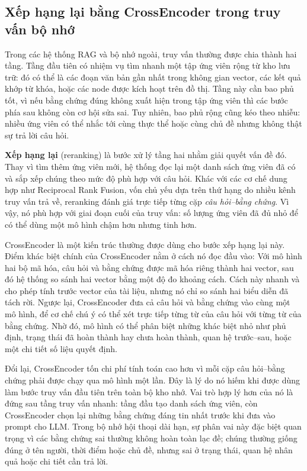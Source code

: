 \documentclass[../main.tex]{subfiles}
\begin{document}
\subsection{Xếp hạng lại bằng CrossEncoder trong truy vấn bộ nhớ}

Trong các hệ thống RAG và bộ nhớ ngoài, truy vấn thường được chia thành hai tầng. Tầng đầu tiên có nhiệm vụ tìm nhanh một tập ứng viên rộng từ kho lưu trữ: đó có thể là các đoạn văn bản gần nhất trong không gian vector, các kết quả khớp từ khóa, hoặc các node được kích hoạt trên đồ thị. Tầng này cần bao phủ tốt, vì nếu bằng chứng đúng không xuất hiện trong tập ứng viên thì các bước phía sau không còn cơ hội sửa sai. Tuy nhiên, bao phủ rộng cũng kéo theo nhiễu: nhiều ứng viên có thể nhắc tới cùng thực thể hoặc cùng chủ đề nhưng không thật sự trả lời câu hỏi.

\textbf{Xếp hạng lại} (reranking) là bước xử lý tầng hai nhằm giải quyết vấn đề đó. Thay vì tìm thêm ứng viên mới, hệ thống đọc lại một danh sách ứng viên đã có và sắp xếp chúng theo mức độ phù hợp với câu hỏi. Khác với các cơ chế dung hợp như Reciprocal Rank Fusion, vốn chủ yếu dựa trên thứ hạng do nhiều kênh truy vấn trả về, reranking đánh giá trực tiếp từng cặp \textit{câu hỏi--bằng chứng}. Vì vậy, nó phù hợp với giai đoạn cuối của truy vấn: số lượng ứng viên đã đủ nhỏ để có thể dùng một mô hình chậm hơn nhưng tinh hơn.

CrossEncoder là một kiến trúc thường được dùng cho bước xếp hạng lại này. Điểm khác biệt chính của CrossEncoder nằm ở cách nó đọc đầu vào: Với mô hình hai bộ mã hóa, câu hỏi và bằng chứng được mã hóa riêng thành hai vector, sau đó hệ thống so sánh hai vector bằng một độ đo khoảng cách. Cách này nhanh và cho phép tính trước vector của tài liệu, nhưng nó chỉ so sánh hai biểu diễn đã tách rời. Ngược lại, CrossEncoder đưa cả câu hỏi và bằng chứng vào cùng một mô hình, để cơ chế chú ý có thể xét trực tiếp từng từ của câu hỏi với từng từ của bằng chứng. Nhờ đó, mô hình có thể phân biệt những khác biệt nhỏ như phủ định, trạng thái đã hoàn thành hay chưa hoàn thành, quan hệ trước--sau, hoặc một chi tiết số liệu quyết định.

Đổi lại, CrossEncoder tốn chi phí tính toán cao hơn vì mỗi cặp câu hỏi--bằng chứng phải được chạy qua mô hình một lần. Đây là lý do nó hiếm khi được dùng làm bước truy vấn đầu tiên trên toàn bộ kho nhớ. Vai trò hợp lý hơn của nó là đứng sau tầng truy vấn nhanh: tầng đầu tạo danh sách ứng viên, còn CrossEncoder chọn lại những bằng chứng đáng tin nhất trước khi đưa vào prompt cho LLM. Trong bộ nhớ hội thoại dài hạn, sự phân vai này đặc biệt quan trọng vì các bằng chứng sai thường không hoàn toàn lạc đề; chúng thường giống đúng ở tên người, thời điểm hoặc chủ đề, nhưng sai ở trạng thái, quan hệ nhân quả hoặc chi tiết cần trả lời.
\end{document}
